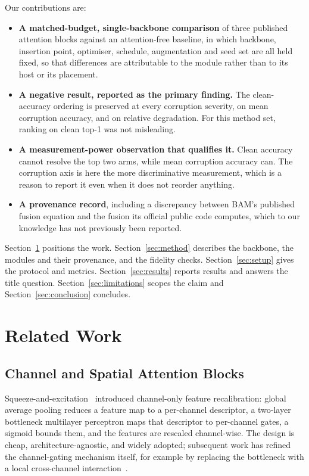 \documentclass[10pt]{article}
\begin{document}
Our contributions are:

\begin{itemize}[leftmargin=1.5em]
  \item \textbf{A matched-budget, single-backbone comparison} of three published
    attention blocks against an attention-free baseline, in which backbone,
    insertion point, optimiser, schedule, augmentation and seed set are all held
    fixed, so that differences are attributable to the module rather than to its
    host or its placement.
  \item \textbf{A negative result, reported as the primary finding.} The
    clean-accuracy ordering is preserved at every corruption severity, on mean
    corruption accuracy, and on relative degradation. For this method set,
    ranking on clean top-1 was not misleading.
  \item \textbf{A measurement-power observation that qualifies it.} Clean
    accuracy cannot resolve the top two arms, while mean corruption accuracy
    can. The corruption axis is here the more discriminative measurement, which
    is a reason to report it even when it does not reorder anything.
  \item \textbf{A provenance record}, including a discrepancy between BAM's
    published fusion equation and the fusion its official public code computes,
    which to our knowledge has not previously been reported.
\end{itemize}

Section~\ref{sec:related} positions the work. Section~\ref{sec:method} describes
the backbone, the modules and their provenance, and the fidelity checks.
Section~\ref{sec:setup} gives the protocol and metrics. Section~\ref{sec:results}
reports results and answers the title question. Section~\ref{sec:limitations}
scopes the claim and Section~\ref{sec:conclusion} concludes.

\section{Related Work}
\label{sec:related}

\subsection{Channel and Spatial Attention Blocks}

Squeeze-and-excitation~\citep{hu2018squeeze} introduced channel-only feature
recalibration: global average pooling reduces a feature map to a per-channel
descriptor, a two-layer bottleneck multilayer perceptron maps that descriptor to
per-channel gates, a sigmoid bounds them, and the features are rescaled
channel-wise. The design is cheap, architecture-agnostic, and widely adopted;
subsequent work has refined the channel-gating mechanism itself, for example by
replacing the bottleneck with a local cross-channel
interaction~\citep{wang2020eca}.
\end{document}
